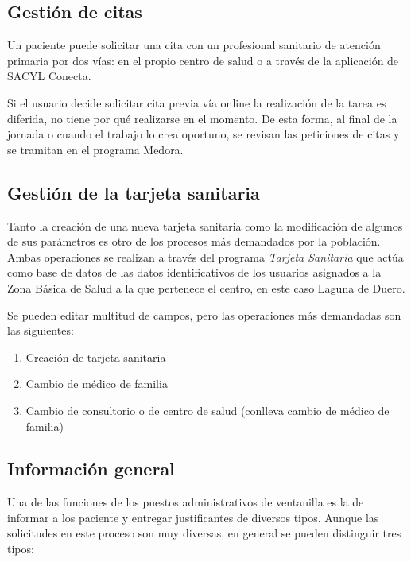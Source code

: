 
\subsection{Gestión de citas}

Un paciente puede solicitar una cita con un profesional sanitario de atención primaria por dos vías: en el propio centro de salud o a través de la aplicación de SACYL Conecta.

Si el usuario decide solicitar cita previa vía online la realización de la tarea es diferida, no tiene por qué realizarse en el momento. De esta forma, al final de la jornada o cuando el trabajo lo crea oportuno, se revisan las peticiones de citas y se tramitan en el programa Medora.

\subsection{Gestión de la tarjeta sanitaria}

Tanto la creación de una nueva tarjeta sanitaria como la modificación de algunos de sus parámetros es otro de los procesos más demandados por la población. Ambas operaciones se realizan a través del programa \textit{Tarjeta Sanitaria} que actúa como base de datos de las datos identificativos de los usuarios asignados a la Zona Básica de Salud a la que pertenece el centro, en este caso Laguna de Duero.

Se pueden editar multitud de campos, pero las operaciones más demandadas son las siguientes:

\begin{enumerate}
    \item Creación de tarjeta sanitaria
    \item Cambio de médico de familia
    \item Cambio de consultorio o de centro de salud (conlleva cambio de médico de familia)
\end{enumerate}

\subsection{Información general}

Una de las funciones de los puestos administrativos de ventanilla es la de informar a los paciente y entregar justificantes de diversos tipos. Aunque las solicitudes en este proceso son muy diversas, en general se pueden distinguir tres tipos:


